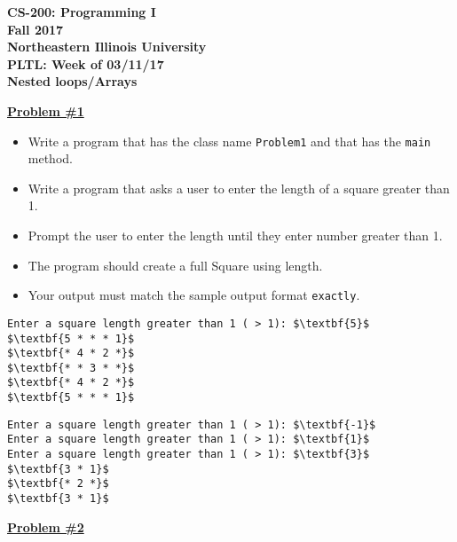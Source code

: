 \documentclass[12pt]{article}
\begin{document}
\begin{center}
	\textbf{CS-200: Programming I}\\
	\textbf{Fall 2017}\\
	\textbf{Northeastern Illinois University}\\
	\textbf{PLTL: Week of 03/11/17}\\
	\textbf{Nested loops/Arrays}
\end{center}


\noindent\underline{\textbf{Problem \#1}}
\begin{itemize}
	\item Write a program that has the class name \texttt{Problem1} and that has the \texttt{main} method. 
	\item Write a program that asks a user to enter the length of a square greater than 1.
	\item Prompt the user to enter the length until they enter number greater than 1.
	\item The program should create a full Square using length.
	\item Your output must match the sample output format \texttt{exactly}.

\end{itemize}
\begin{center}
\begin{minipage}{8cm}

\begin{lstlisting}[escapechar=$]
Enter a square length greater than 1 ( > 1): $\textbf{5}$
$\textbf{5 * * * 1}$
$\textbf{* 4 * 2 *}$
$\textbf{* * 3 * *}$
$\textbf{* 4 * 2 *}$
$\textbf{5 * * * 1}$
\end{lstlisting}
\end{minipage}
\hspace*{.5cm}
\begin{minipage}{8cm}
\begin{lstlisting}[escapechar=$]
Enter a square length greater than 1 ( > 1): $\textbf{-1}$
Enter a square length greater than 1 ( > 1): $\textbf{1}$
Enter a square length greater than 1 ( > 1): $\textbf{3}$
$\textbf{3 * 1}$
$\textbf{* 2 *}$
$\textbf{3 * 1}$
\end{lstlisting}
\end{minipage}
\end{center}
\vspace*{0.5cm}
\noindent\underline{\textbf{Problem \#2}}
\end{document}
